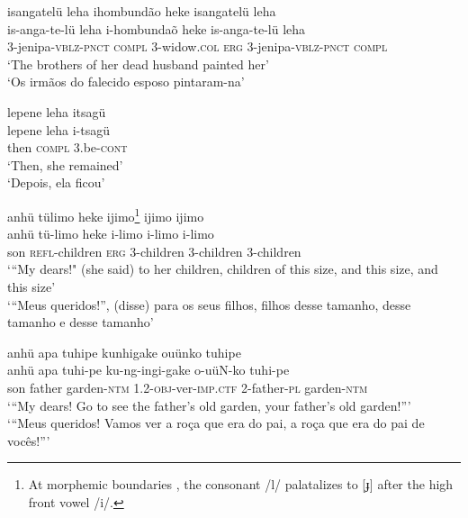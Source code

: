 \documentclass[output=paper,
modfonts,nonflat
]{langsci/langscibook}
\begin{document}
 \ea isangatelü leha ihombundão{\footnotemark}{} heke isangatelü leha\\[.3em]
\gll is-anga-te-lü		leha	i-hombundaõ 	heke	is-anga-te-lü		leha\\
3-jenipa-\textsc{vblz-pnct} 	\textsc{compl}	3-widow.\textsc{col} 	\textsc{erg} 	3-jenipa-\textsc{vblz}\textsc{-pnct}	\textsc{compl} \\
\glt ‘The brothers of her dead husband painted her’ \\
‘Os irmãos do falecido esposo pintaram-na’\\
\z


\ea lepene leha itsagü\\[.3em]
\gll lepene	leha 	i-tsagü\\
then 	\textsc{compl}  3.be-\textsc{cont}\\
\glt ‘Then, she remained’\\
‘Depois, ela ficou’\\
\z

\ea anhü tülimo heke ijimo\footnote{At morphemic boundaries , the consonant /l/ palatalizes to [ɟ] after the high front vowel /i/.} ijimo ijimo\\[.3em]
\gll anhü	tü-limo	heke	i-limo		i-limo	i-limo\\
son \textsc{refl}-children 	\textsc{erg} 	3-children 3-children 3-children\\
\glt ‘“My dears!" (she said) to her children, children of this size, and this size, and this size'\\ ‘“Meus queridos!”, (disse) para os seus filhos, filhos desse tamanho, desse tamanho e desse tamanho’\\
\z

\ea anhü apa tuhipe kunhigake ouünko tuhipe\\[.3em]
\gll anhü apa	tuhi-pe		ku-ng-ingi-gake{\footnotemark}{}	o-uüN-ko	tuhi-pe\\
son father 	garden-\textsc{ntm} 	1.2-\textsc{obj}-ver-\textsc{imp.ctf}		2-father-\textsc{pl} 	garden-\textsc{ntm}\\
\glt ‘“My dears! Go to see the father’s old garden, your father’s old garden!”’\\
‘“Meus queridos! Vamos ver a roça que era do pai, a roça que era do pai de vocês!”’\\
\z
\end{document}
